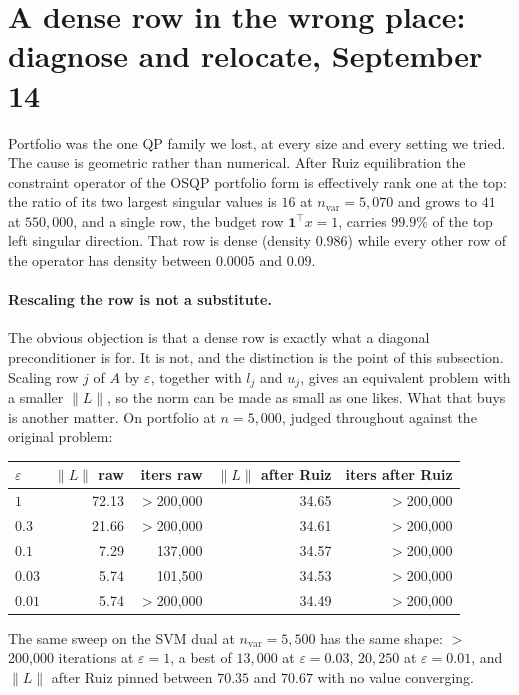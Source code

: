 \documentclass[11pt]{article}
\begin{document}
\section{A dense row in the wrong place: diagnose and relocate, September 14}
\label{app:relocate}

Portfolio was the one QP family we lost, at every size and every setting we
tried. The cause is geometric rather than numerical. After Ruiz
equilibration the constraint operator of the OSQP portfolio form is
effectively rank one at the top: the ratio of its two largest singular
values is $16$ at $n_{\mathrm{var}}=5{,}070$ and grows to $41$ at
$550{,}000$, and a single row, the budget row $\mathbf{1}^\top x = 1$,
carries $99.9\%$ of the top left singular direction. That row is dense
(density $0.986$) while every other row of the operator has density between
$0.0005$ and $0.09$.

\paragraph{Rescaling the row is not a substitute.}
The obvious objection is that a dense row is exactly what a diagonal
preconditioner is for. It is not, and the distinction is the point of this
subsection. Scaling row $j$ of $A$ by $\varepsilon$, together with $l_j$ and
$u_j$, gives an equivalent problem with a smaller $\|L\|$, so the norm can
be made as small as one likes. What that buys is another matter. On
portfolio at $n=5{,}000$, judged throughout against the original problem:

\begin{center}
\begin{tabular}{lrrrr}
\toprule
$\varepsilon$ & $\|L\|$ raw & iters raw & $\|L\|$ after Ruiz & iters after Ruiz \\
\midrule
$1$    & 72.13 & $>$200{,}000 & 34.65 & $>$200{,}000 \\
$0.3$  & 21.66 & $>$200{,}000 & 34.61 & $>$200{,}000 \\
$0.1$  & 7.29  & 137{,}000    & 34.57 & $>$200{,}000 \\
$0.03$ & 5.74  & 101{,}500    & 34.53 & $>$200{,}000 \\
$0.01$ & 5.74  & $>$200{,}000 & 34.49 & $>$200{,}000 \\
\bottomrule
\end{tabular}
\end{center}

The same sweep on the SVM dual at $n_{\mathrm{var}}=5{,}500$ has the same
shape: $>$200{,}000 iterations at $\varepsilon=1$, a best of $13{,}000$ at
$\varepsilon=0.03$, $20{,}250$ at $\varepsilon=0.01$, and $\|L\|$ after Ruiz
pinned between $70.35$ and $70.67$ with no value converging.
\end{document}
